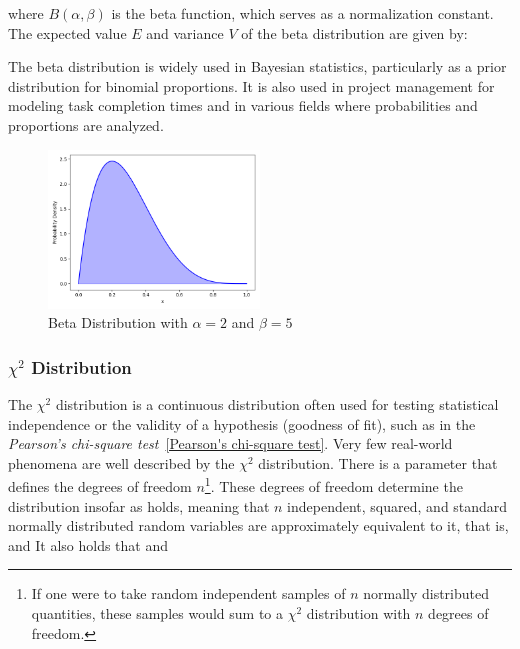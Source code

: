 where $B(\alpha, \beta)$ is the beta function, which serves as a normalization constant. The expected value $E$ and variance $V$ of the beta distribution are given by:


The beta distribution is widely used in Bayesian statistics, particularly as a prior distribution for binomial proportions. It is also used in project management for modeling task completion times and in various fields where probabilities and proportions are analyzed.

\begin{figure}[h]
    \centering
    \includegraphics[width=0.5\textwidth]{../images/plot_beta_distribution.png}
    \caption{Beta Distribution with $\alpha=2$ and $\beta=5$}
    \label{fig:beta_distribution}
\end{figure}

\subsubsection{$\chi^2$ Distribution}\label{Chi Square Distribution}
The $\chi^2$ distribution is a continuous distribution often used for testing statistical independence or the validity of a hypothesis (goodness of fit), such as in the \textit{Pearson's chi-square test}~\ref{Pearson's chi-square test}. Very few real-world phenomena are well described by the $\chi^2$ distribution. There is a parameter that defines the degrees of freedom $n$\footnote{If one were to take random independent samples of $n$ normally distributed quantities, these samples would sum to a $\chi^2$ distribution with $n$ degrees of freedom.}. These degrees of freedom determine the distribution insofar as
holds, meaning that $n$ independent, squared, and standard normally distributed random variables are approximately equivalent to it, that is,
and
It also holds that
and


